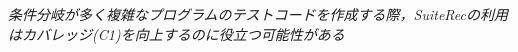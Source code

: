 \documentclass[12pt]{jarticle} %
\begin{document}

\begin{breakbox}
\textit{条件分岐が多く複雑なプログラムのテストコードを作成する際，{\sf SuiteRec}の利用はカバレッジ(C1)を向上するのに役立つ可能性がある}
\end{breakbox}
\end{document}
